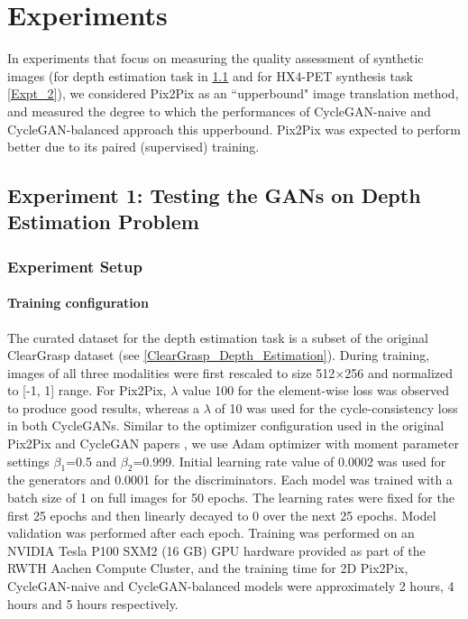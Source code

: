 \chapter{Experiments}
\label{Experiments}
In experiments that focus on measuring the quality assessment of synthetic images (for depth estimation task in \ref{Expt_1} and for HX4-PET synthesis task \ref{Expt_2}), we considered Pix2Pix as an ``upperbound" image translation method, and measured the degree to which the performances of CycleGAN-naive and CycleGAN-balanced approach this upperbound. Pix2Pix was expected to perform better due to its paired (supervised) training.



\section{Experiment 1: Testing the GANs on Depth Estimation Problem}
\label{Expt_1}


\subsection{Experiment Setup}

\subsubsection{Training configuration}
The curated dataset for the depth estimation task is a subset of the original ClearGrasp dataset (see \ref{ClearGrasp_Depth_Estimation}). During training, images of all three modalities were first rescaled to size 512$\times$256 and normalized to [-1, 1] range.  For Pix2Pix, $\lambda$ value 100 for the element-wise loss was observed to produce good results, whereas a $\lambda$ of 10 was used for the cycle-consistency loss in both CycleGANs. Similar to the optimizer configuration used in the original Pix2Pix and CycleGAN papers \cite{isola2017image, zhu2017unpaired}, we use Adam optimizer with moment parameter settings $\beta_1$=0.5 and $\beta_2$=0.999. Initial learning rate value of 0.0002 was used for the generators and 0.0001 for the discriminators. Each model was trained with a batch size of 1 on full images for 50 epochs. The learning rates were fixed for the first 25 epochs and then linearly decayed to 0 over the next 25 epochs. Model validation was performed after each epoch. Training was performed on an NVIDIA Tesla P100 SXM2 (16 GB) GPU hardware provided as part of the RWTH Aachen Compute Cluster, and the training time for 2D Pix2Pix, CycleGAN-naive and CycleGAN-balanced models were approximately 2 hours, 4 hours and 5 hours respectively.

